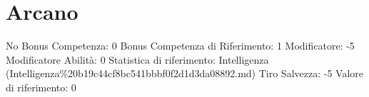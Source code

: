 \section{Arcano}\label{arcano}

\begin{description}
\tightlist
\item[Tags: ABI]
No Bonus Competenza: 0 Bonus Competenza di Riferimento: 1 Modificatore:
-5 Modificatore Abilità: 0 Statistica di riferimento: Intelligenza
(Intelligenza\%20b19c44cf8bc541bbbf0f2d1d3da08892.md) Tiro Salvezza: -5
Valore di riferimento: 0
\end{description}

